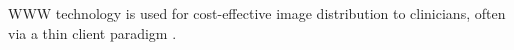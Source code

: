 
WWW technology is used for cost-effective image distribution to clinicians, often via a thin client paradigm \cite{bushberg2011essential}.


